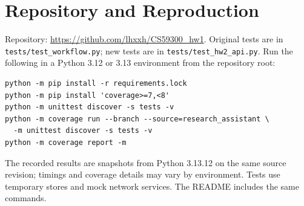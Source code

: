 \documentclass[10pt]{article}
\begin{document}
\section{Repository and Reproduction}
Repository: \url{https://github.com/lhxxh/CS59300_hw1}. Original tests are in \texttt{tests/test\_workflow.py}; new tests are in \texttt{tests/test\_hw2\_api.py}. Run the following in a Python 3.12 or 3.13 environment from the repository root:
\begin{verbatim}
python -m pip install -r requirements.lock
python -m pip install 'coverage>=7,<8'
python -m unittest discover -s tests -v
python -m coverage run --branch --source=research_assistant \
  -m unittest discover -s tests -v
python -m coverage report -m
\end{verbatim}
The recorded results are snapshots from Python 3.13.12 on the same source revision; timings and coverage details may vary by environment. Tests use temporary stores and mock network services. The README includes the same commands.
\end{document}
